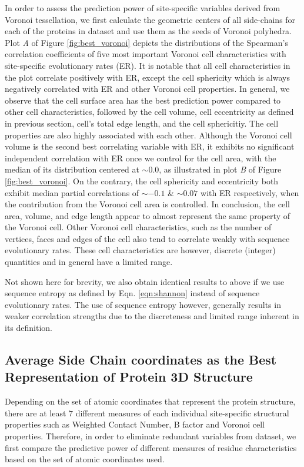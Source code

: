 \documentclass[11pt]{article}
\begin{document}
    In order to assess the prediction power of site-specific variables derived from Voronoi tessellation, we first calculate the geometric centers of all side-chains for each of the proteins in dataset and use them as the seeds of Voronoi polyhedra. Plot {\it A} of Figure \ref{fig:best_voronoi} depicts the distributions of the Spearman's correlation coefficients of five most important Voronoi cell characteristics with site-specific evolutionary rates (ER). It is notable that all cell characteristics in the plot correlate positively with ER, except the cell sphericity which is always negatively correlated with ER and other Voronoi cell properties. In general, we observe that the cell surface area has the best prediction power compared to other cell characteristics, followed by the cell volume, cell eccentricity as defined in previous section, cell's total edge length, and the cell sphericitiy. The cell properties are also highly associated with each other. Although the Voronoi cell volume is the second best correlating variable with ER, it exhibits no significant independent correlation with ER once we control for the cell area, with the median of its distribution centered at $\sim0.0$, as illustrated in plot {\it B} of Figure \ref{fig:best_voronoi}. On the contrary, the cell sphericity and eccentricity both exhibit median partial correlations of $\sim-0.1$ \& $\sim0.07$ with ER respectively, when the contribution from the Voronoi cell area is controlled. In conclusion, the cell area, volume, and edge length appear to almost represent the same property of the Voronoi cell. Other Voronoi cell characteristics, such as the number of vertices, faces and edges of the cell also tend to correlate weakly with sequence evolutionary rates. These cell characteristics are however, discrete (integer) quantities and in general have a limited range.

    Not shown here for brevity, we also obtain identical results to above if we use sequence entropy as defined by Eqn. \ref{eqn:shannon} instead of sequence evolutionary rates. The use of sequence entropy however, generally results in weaker correlation strengths due to the discreteness and limited range inherent in its definition.

    \subsection*{Average Side Chain coordinates as the Best Representation of Protein 3D Structure}

        Depending on the set of atomic coordinates that represent the protein structure, there are at least $7$ different measures of each individual  site-specific structural properties such as Weighted Contact Number, B factor and Voronoi cell properties. Therefore, in order to eliminate redundant variables from dataset, we first compare the predictive power of different measures of residue characteristics based on the set of atomic coordinates used.
        \\
\end{document}
